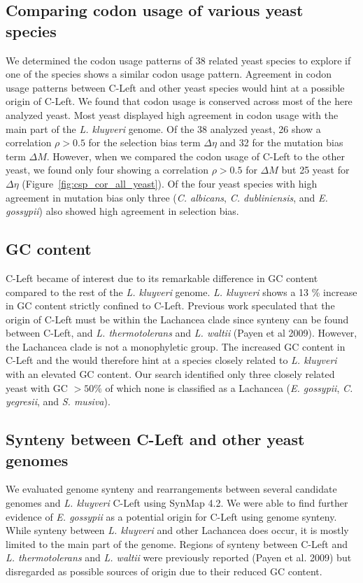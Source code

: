 \documentclass[12pt,draft]{article}
\begin{document}
\subsection*{Comparing codon usage of various yeast species}
We determined the codon usage patterns of 38 related yeast species to explore if one of the species shows a similar codon usage pattern.
Agreement in codon usage patterns between C-Left and other yeast species would hint at a possible origin of C-Left.
We found that codon usage is conserved across most of the here analyzed yeast. 
Most yeast displayed high agreement in codon usage with the main part of the \textit{L. kluyveri} genome. Of the 38 analyzed yeast, 26 show a correlation $\rho > 0.5$ for the selection bias term $\Delta \eta$ and 32 for the mutation bias term $\Delta M$.
However, when we compared the codon usage of C-Left to the other yeast, we found only four showing a correlation $\rho > 0.5$ for $\Delta M$ but 25 yeast for $\Delta \eta$ (Figure~\ref{fig:csp_cor_all_yeast}).
Of the four yeast species with high agreement in mutation bias only three (\textit{C. albicans}, \textit{C. dubliniensis}, and \textit{E. gossypii}) also showed high agreement in selection bias.

\subsection{GC content}
C-Left became of interest due to its remarkable difference in GC content compared to the rest of the \textit{L. kluyveri} genome.
\textit{L. kluyveri} shows a 13 \% increase in GC content strictly confined to C-Left. 
Previous work speculated that the origin of C-Left must be within the Lachancea clade since synteny can be found between C-Left, and \textit{L. thermotolerans} and \textit{L. waltii} (Payen et al 2009).
However, the Lachancea clade is not a monophyletic group.
The increased GC content in C-Left and the would therefore hint at a species closely related to \textit{L. kluyveri} with an elevated GC content. 
Our search identified only three closely related yeast with GC $> 50\%$ of which none is classified as a Lachancea (\textit{E. gossypii}, \textit{C. yegresii}, and \textit{S. musiva}).

\subsection*{Synteny between C-Left and other yeast genomes}

We evaluated genome synteny and rearrangements between several candidate genomes and \textit{L. kluyveri} C-Left using SynMap 4.2.
We were able to find further evidence of \textit{E. gossypii} as a potential origin for C-Left using genome synteny.
While synteny between \textit{L. kluyveri} and other Lachancea does occur, it is mostly limited to the main part of the genome.
Regions of synteny between C-Left and \textit{L. thermotolerans} and \textit{L. waltii} were previously reported (Payen et al. 2009) but disregarded as possible sources of origin due to their reduced GC content.
\end{document}
